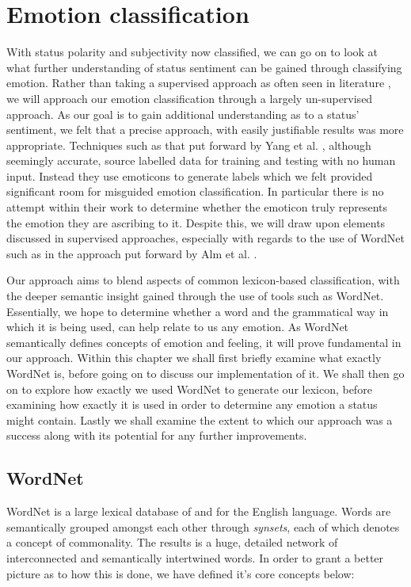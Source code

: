 \chapter{Emotion classification}
\label{emotion}

With status polarity and subjectivity now classified, we can go on to look at what further understanding of status sentiment can be gained through classifying emotion. Rather than taking a supervised approach as often seen in literature \cite{Alm:2005vc}, we will approach our emotion classification through a largely un-supervised approach. As our goal is to gain additional understanding as to a status' sentiment, we felt that a precise approach, with easily justifiable results was more appropriate. Techniques such as that put forward by Yang et al. \cite{Yang:2007wx}, although seemingly accurate, source labelled data for training and testing with no human input. Instead they use emoticons to generate labels which we felt provided significant room for misguided emotion classification. In particular there is no attempt within their work to determine whether the emoticon truly represents the emotion they are ascribing to it. Despite this, we will draw upon elements discussed in supervised approaches, especially with regards to the use of WordNet such as in the approach put forward by Alm et al. \cite{Alm:2005vc}. 


Our approach aims to blend aspects of common lexicon-based classification, with the deeper semantic insight gained through the use of tools such as WordNet. Essentially, we hope to determine whether a word and the grammatical way in which it is being used, can help relate to us any emotion. As WordNet semantically defines concepts of emotion and feeling, it will prove fundamental in our approach. Within this chapter we shall first briefly examine what exactly WordNet is, before going on to discuss our implementation of it. We shall then go on to explore how exactly we used WordNet to generate our lexicon, before examining how exactly it is used in order to determine any emotion a status might contain. Lastly we shall examine the extent to which our approach was a success along with its potential for any further improvements.

\section{WordNet}
\label{emotion:wordnet}

WordNet is a large lexical database of and for the English language. Words are semantically grouped amongst each other through \emph{synsets}, each of which denotes a concept of commonality. The results is a huge, detailed network of interconnected and semantically intertwined words. In order to grant a better picture as to how this is done, we have defined it's core concepts below:

